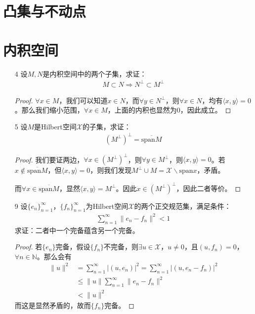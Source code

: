 	\section{凸集与不动点}
	
	\section{内积空间}
	\begin{enumerate}[leftmargin=2cm, label=\arabic*]
		\item[4] 设$M,N$是内积空间中的两个子集，求证：
		\begin{align*}
			M\subset N\Rightarrow N^{\perp} \subset M^{\perp}
		\end{align*}
		\begin{proof}
			$\forall x\in M$，我们可以知道$x\in N$，而$\forall y\in N^{\perp}$，则$\forall x\in N$，均有$\langle x,y\rangle = 0$。那么我们缩小范围，$\forall x\in M$，上面的内积也显然为$0$，因此成立。
		\end{proof}
		
		\item[5] 设$M$是Hilbert空间$\mathscr{X}$的子集，求证：
		\begin{align*}
			(M^{\perp})^{\perp} = \overline{\text{span}M}
		\end{align*}
		\begin{proof}
			我们要证两边，$\forall x\in (M^{\perp})^{\perp}$，则$\forall y\in M^{\perp}$，则$\langle x,y\rangle = 0$。若$x\notin \overline{\text{span}M}$，但$\langle x, y\rangle = 0$，则我们发现$M^{\perp}\cup M = \mathscr{X}\backslash \text{span} x$，矛盾。
			
			而$\forall x\in \overline{\text{span}M}$，显然$\langle x, y\rangle = M^{\perp}$。因此$x\in (M^{\perp})^{\perp}$，因此二者等价。
		\end{proof}
		
		\item[9] 设$\{e_n\}_{n=1}^{\infty}$，$\{f_n\}_{n=1}^{\infty}$为Hilbert空间$\mathscr{X}$的两个正交规范集，满足条件：
		\begin{align*}
			\sum\limits_{n=1}^{\infty} \|e_n - f_n\|^2 < 1
		\end{align*}
		求证：二者中一个完备蕴含另一个完备。
		\begin{proof}
			若$\{e_n\}$完备，假设$\{f_n\}$不完备，则$\exists u \in\mathscr{X}$，$u\neq 0$，且$(u, f_n) = 0$，$\forall n\in\mathbb{N}$。那么会有
			\begin{align*}
				\|u\|^2 &= \sum\limits_{n=1}^{\infty} |(u, e_n)|^2 = \sum\limits_{n=1}^{\infty} |(u, e_n-f_n)|^2 \\
				& \leqslant \|u\| \sum\limits_{n=1}^{\infty} \|e_n - f_n\|^2 \\
				& < \|u\|^2
			\end{align*}
			而这是显然矛盾的，故而$\{f_n\}$完备。
		\end{proof}
		

\end{enumerate}
